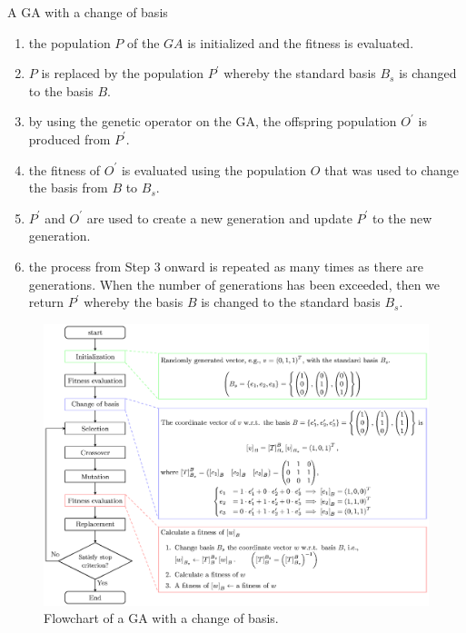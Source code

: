\begin{algorithm}[H]
	\centering
	\caption{A GA with a change of basis} \label{alg:step}
	\begin{algorithmic}
		\State
		\begin{enumerate}[leftmargin=*, label=Step \arabic*:]
			\item the population $ P $ of the $ GA $ is initialized and the fitness is evaluated.
			\item $ P $ is replaced by the population $ P^\prime $ whereby the standard basis $ B_s $ is changed to the basis $ B $.
			\item by using the genetic operator on the GA, the offspring population $ O^\prime $ is produced from $ P^\prime $.
			\item the fitness of $ O^\prime $ is evaluated using the population $ O $ that was used to change the basis from $ B $ to $ B_s $.
			\item $ P^\prime $ and $ O^\prime $ are used to create a new generation and update $ P^\prime $ to the new generation.
			\item the process from Step 3 onward is repeated as many times as there are generations. When the number of generations has been exceeded, then we return $ P^\prime $ whereby the basis $ B $ is changed to the standard basis $ B_s $.
		\end{enumerate}
	\end{algorithmic}
\end{algorithm}

\begin{figure}[H]
	\centering
	\includegraphics[width=\textwidth]{./flowchart_change_basis}
	\caption{Flowchart of a GA with a change of basis.} \label{fig:flowchart}
\end{figure}

